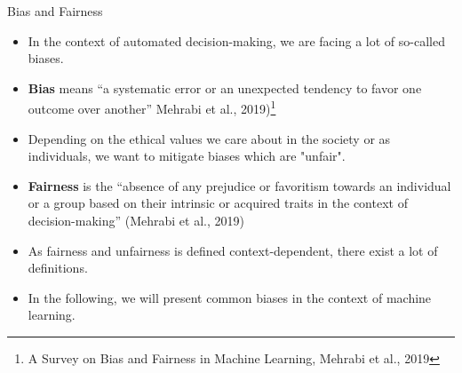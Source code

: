 \begin{vbframe}{Bias and Fairness}

\begin{itemize}
   \item In the context of automated decision-making, we are facing a lot of so-called biases.
   \item \textbf{Bias} means \enquote{a systematic error or an unexpected tendency to favor one outcome over another} Mehrabi et al., 2019)\footnote{A Survey on Bias and Fairness in Machine Learning, Mehrabi et al., 2019}
   
   \item Depending on the ethical values we care about in the society or as individuals, we want to mitigate biases which are "unfair". 
   
   \item \textbf{Fairness} is the \enquote{absence of any prejudice or favoritism towards an individual or a group based on their intrinsic or acquired traits in the context of decision-making} 
(Mehrabi et al., 2019)

\item As fairness and unfairness is defined context-dependent, there exist a lot of definitions. 

\item In the following, we will present common biases in the context of machine learning. 

\end{itemize}
\end{vbframe}


